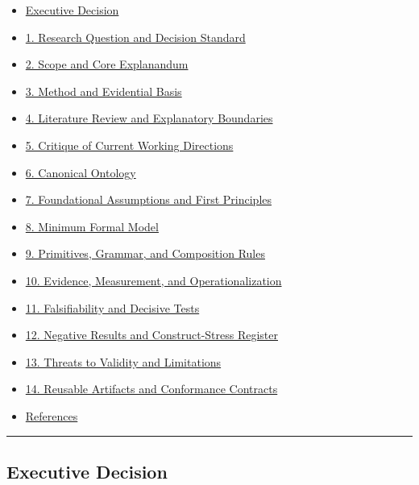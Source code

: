 \documentclass[
]{article}
\providecommand{\tightlist}{%
  \setlength{\itemsep}{0pt}\setlength{\parskip}{0pt}}
\begin{document}
\begin{itemize}
\tightlist
\item
  \hyperref[executive-decision]{Executive Decision}
\item
  \hyperref[1-research-question-and-decision-standard]{1. Research
  Question and Decision Standard}
\item
  \hyperref[2-scope-and-core-explanandum]{2. Scope and Core Explanandum}
\item
  \hyperref[3-method-and-evidential-basis]{3. Method and Evidential
  Basis}
\item
  \hyperref[4-literature-review-and-explanatory-boundaries]{4.
  Literature Review and Explanatory Boundaries}
\item
  \hyperref[5-critique-of-current-working-directions]{5. Critique of
  Current Working Directions}
\item
  \hyperref[6-canonical-ontology]{6. Canonical Ontology}
\item
  \hyperref[7-foundational-assumptions-and-first-principles]{7.
  Foundational Assumptions and First Principles}
\item
  \hyperref[8-minimum-formal-model]{8. Minimum Formal Model}
\item
  \hyperref[9-primitives-grammar-and-composition-rules]{9. Primitives,
  Grammar, and Composition Rules}
\item
  \hyperref[10-evidence-measurement-and-operationalization]{10.
  Evidence, Measurement, and Operationalization}
\item
  \hyperref[11-falsifiability-and-decisive-tests]{11. Falsifiability and
  Decisive Tests}
\item
  \hyperref[12-negative-results-and-construct-stress-register]{12.
  Negative Results and Construct-Stress Register}
\item
  \hyperref[13-threats-to-validity-and-limitations]{13. Threats to
  Validity and Limitations}
\item
  \hyperref[14-reusable-artifacts-and-conformance-contracts]{14.
  Reusable Artifacts and Conformance Contracts}
\item
  \hyperref[references]{References}
\end{itemize}

\begin{center}\rule{0.5\linewidth}{0.5pt}\end{center}

\subsection{Executive Decision}\label{executive-decision}
\end{document}
